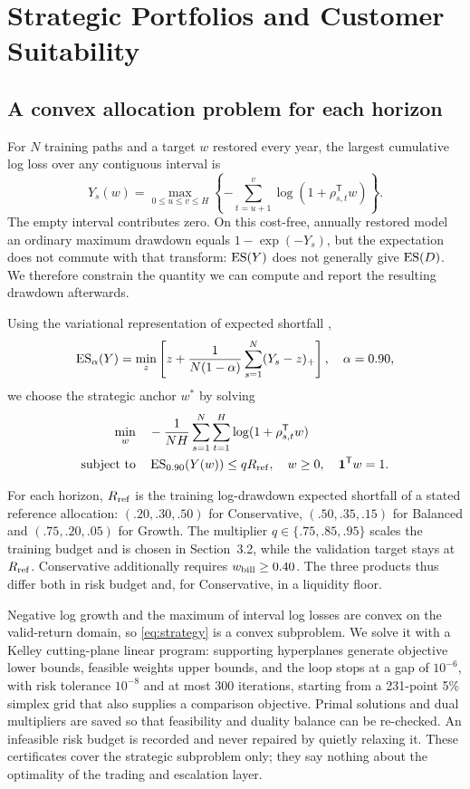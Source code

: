 \section{Strategic Portfolios and Customer Suitability}
\subsection{A convex allocation problem for each horizon}
For $N$ training paths and a target $w$ restored every year, the largest cumulative log loss over any contiguous interval is
\begin{equation}
Y_s(w)=\max_{0\leq u\leq v\leq H}\left\{-\sum_{t=u+1}^{v}\log(1+\rho_{s,t}^{\mathsf T}w)\right\}.
\end{equation}
The empty interval contributes zero. On this cost-free, annually restored model an ordinary maximum drawdown equals $1-\exp(-Y_s)$, but the expectation does not commute with that transform: $\operatorname{ES}(Y)$ does not generally give $\operatorname{ES}(D)$. We therefore constrain the quantity we can compute and report the resulting drawdown afterwards.

Using the variational representation of expected shortfall \cite{cvar},
\begin{equation}
\operatorname{ES}_\alpha(Y)=\min_z\left[z+\frac{1}{N(1-\alpha)}\sum_{s=1}^{N}(Y_s-z)_+\right],\quad \alpha=0.90,
\end{equation}
we choose the strategic anchor $w^*$ by solving
\begin{align}
\min_w\quad &-\frac{1}{NH}\sum_{s=1}^{N}\sum_{t=1}^{H}\log(1+\rho_{s,t}^{\mathsf T}w)\\
\text{subject to}\quad &\operatorname{ES}_{0.90}(Y(w))\leq qR_{\rm ref},\quad w\geq0,\quad\mathbf{1}^{\mathsf T}w=1.
\label{eq:strategy}
\end{align}

For each horizon, $R_{\rm ref}$ is the training log-drawdown expected shortfall of a stated reference allocation: $(.20,.30,.50)$ for Conservative, $(.50,.35,.15)$ for Balanced and $(.75,.20,.05)$ for Growth. The multiplier $q\in\{.75,.85,.95\}$ scales the training budget and is chosen in Section~3.2, while the validation target stays at $R_{\rm ref}$. Conservative additionally requires $w_{\rm bill}\geq0.40$. The three products thus differ both in risk budget and, for Conservative, in a liquidity floor.

Negative log growth and the maximum of interval log losses are convex on the valid-return domain, so \eqref{eq:strategy} is a convex subproblem. We solve it with a Kelley cutting-plane linear program: supporting hyperplanes generate objective lower bounds, feasible weights upper bounds, and the loop stops at a gap of $10^{-6}$, with risk tolerance $10^{-8}$ and at most 300 iterations, starting from a 231-point 5\% simplex grid that also supplies a comparison objective. Primal solutions and dual multipliers are saved so that feasibility and duality balance can be re-checked. An infeasible risk budget is recorded and never repaired by quietly relaxing it. These certificates cover the strategic subproblem only; they say nothing about the optimality of the trading and escalation layer.

